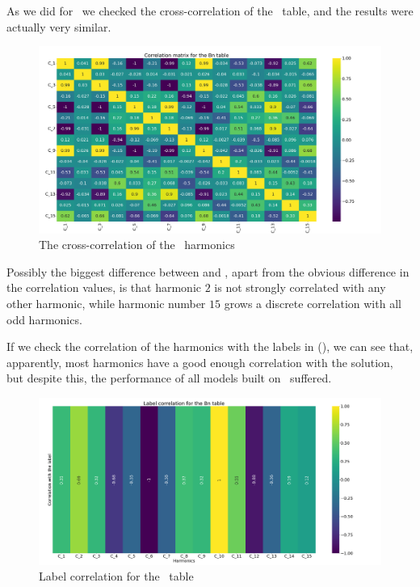 As we did for \an\ we checked the cross-correlation of the \bn\ table, and the results were actually very
similar.
\begin{figure}[h!]
	\centering
	\includegraphics[width=\linewidth]{img/Bn_corr_matrix.png}
	\caption{The cross-correlation of the \bn\ harmonics} \label{fig:bn-corr}
\end{figure}
Possibly the biggest difference between  and , apart from the
obvious difference in the correlation values, is that harmonic $2$ is not strongly correlated with
any other harmonic, while harmonic number $15$ grows a discrete correlation with all odd harmonics.

If we check the correlation of the harmonics with the labels in (), we can see
that, apparently, most harmonics have a good enough correlation with the solution, but despite this, the performance of all
models built on \bn\ suffered.
\begin{figure}
	\centering
	\includegraphics[width=\linewidth]{img/Bn_label_corr.png}
	\caption{Label correlation for the \bn\ table} \label{fig:bn-lcorr}
\end{figure}

